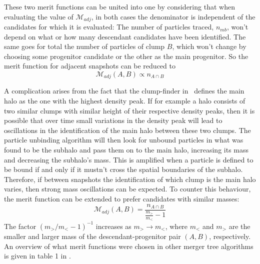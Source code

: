 These two merit functions can be united into one by considering that when evaluating the value of $\mathcal{M}_{adj}$, in both cases the denominator is independent of the candidates for which it is evaluated:
The number of particles traced, $n_{mb}$, won't depend on what or how many descendant candidates have been identified.
The same goes for total the number of particles of clump $B$, which won't change by choosing some progenitor candidate or the other as the main progenitor.
So the merit function for adjacent snapshots can be reduced to
\begin{equation}
    \mathcal{M}_{adj}(A,B) \propto n_{A \cap B}
\end{equation}





A complication arises from the fact that the clump-finder in \ramses\ defines the main halo as the one with the highest density peak.
If for example a halo consists of two similar clumps with similar height of their respective density peaks, then it is possible that over time small variations in the density peak will lead to oscillations in the identification of the main halo between these two clumps.
The particle unbinding algorithm will then look for unbound particles in what was found to be the subhalo and pass them on to the main halo, increasing its mass and decreasing the subhalo's mass.
This is amplified when a particle is defined to be bound if and only if it mustn't cross the spatial boundaries of the subhalo.
Therefore, if between snapshots the identification of which clump is the main halo varies, then strong mass oscillations can be expected.
To counter this behaviour, the merit function can be extended to prefer candidates with similar masses:
\begin{equation}
    \mathcal{M}_{adj}(A,B) = \frac{n_{A \cap B}}{\frac{m_>}{m_<}-1} \label{eq:merit}
\end{equation}
The factor $(m_>/m_< - 1) ^{-1}$ increases as $m_> \rightarrow m_<$, where $m_<$ and $m_>$ are the smaller and larger mass of the descendant-progenitor pair $(A,B)$, respectively.
An overview of what merit functions were chosen in other merger tree algorithms is given in table 1 in \cite{SUSSING_COMPARISON}.



